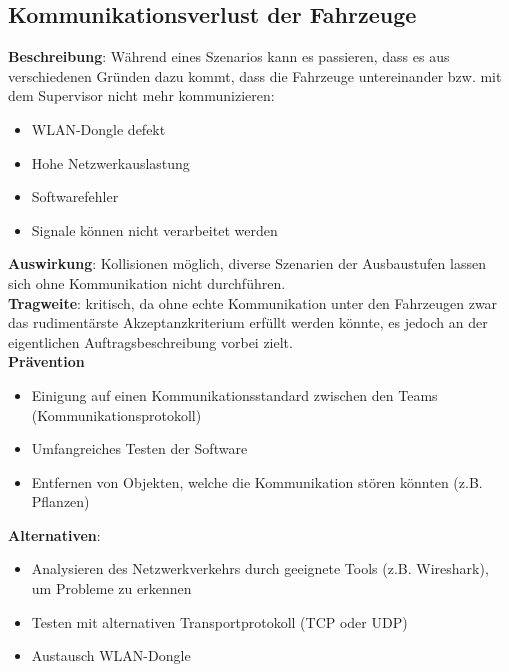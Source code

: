 \documentclass[a4paper, 12pt, titlepage]{scrartcl}
\begin{document}
	\subsection{Kommunikationsverlust der Fahrzeuge}
		\textbf{Beschreibung}: W\"ahrend eines Szenarios kann es passieren, dass es aus verschiedenen Gr\"unden dazu kommt, dass die Fahrzeuge untereinander bzw. mit dem Supervisor nicht mehr kommunizieren:
			\begin{itemize}
				\item WLAN-Dongle defekt
				\item Hohe Netzwerkauslastung
				\item Softwarefehler
				\item Signale k\"onnen nicht verarbeitet werden
			\end{itemize}
		\textbf{Auswirkung}: Kollisionen m\"oglich, diverse Szenarien der Ausbaustufen lassen sich ohne Kommunikation nicht durchf\"uhren.\\
		\textbf{Tragweite}: kritisch, da ohne echte Kommunikation unter den Fahrzeugen zwar das rudiment\"arste Akzeptanzkriterium erf\"ullt werden k\"onnte, es jedoch an der eigentlichen Auftragsbeschreibung vorbei zielt.\\
		\textbf{Pr\"avention}
			\begin{itemize}
				\item Einigung auf einen Kommunikationsstandard zwischen den Teams (Kommunikationsprotokoll)
				\item Umfangreiches Testen der Software
				\item Entfernen von Objekten, welche die Kommunikation st\"oren k\"onnten  (z.B. Pflanzen)
			\end{itemize}
		\textbf{Alternativen}: 
			\begin{itemize}
				\item Analysieren des Netzwerkverkehrs durch geeignete Tools (z.B. Wireshark), um Probleme zu erkennen
				\item Testen mit alternativen Transportprotokoll (TCP oder UDP)
				\item Austausch WLAN-Dongle
			\end{itemize}
		
\end{document}
